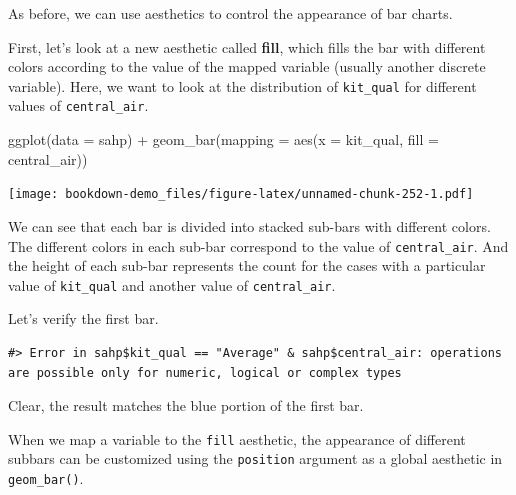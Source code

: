 \documentclass[
]{book}
\newenvironment{Shaded}{\begin{snugshade}}{\end{snugshade}}
\newcommand{\AttributeTok}[1]{\textcolor[rgb]{0.77,0.63,0.00}{#1}}
\newcommand{\FunctionTok}[1]{\textcolor[rgb]{0.00,0.00,0.00}{#1}}
\newcommand{\NormalTok}[1]{#1}
\newcommand{\SpecialCharTok}[1]{\textcolor[rgb]{0.00,0.00,0.00}{#1}}
\newcommand{\StringTok}[1]{\textcolor[rgb]{0.31,0.60,0.02}{#1}}
\begin{document}
As before, we can use aesthetics to control the appearance of bar charts.

First, let's look at a new aesthetic called \textbf{fill}, which fills the bar with different colors according to the value of the mapped variable (usually another discrete variable). Here, we want to look at the distribution of \texttt{kit\_qual} for different values of \texttt{central\_air}.

\begin{Shaded}
\begin{Highlighting}[]
\FunctionTok{ggplot}\NormalTok{(}\AttributeTok{data =}\NormalTok{ sahp) }\SpecialCharTok{+} \FunctionTok{geom\_bar}\NormalTok{(}\AttributeTok{mapping =} \FunctionTok{aes}\NormalTok{(}\AttributeTok{x =}\NormalTok{ kit\_qual, }\AttributeTok{fill =}\NormalTok{ central\_air))}
\end{Highlighting}
\end{Shaded}

\texttt{[image: bookdown-demo\_files/figure-latex/unnamed-chunk-252-1.pdf]}

We can see that each bar is divided into stacked sub-bars with different colors. The different colors in each sub-bar correspond to the value of \texttt{central\_air}. And the height of each sub-bar represents the count for the cases with a particular value of \texttt{kit\_qual} and another value of \texttt{central\_air}.

Let's verify the first bar.

\begin{Shaded}
\end{Shaded}

\begin{verbatim}
#> Error in sahp$kit_qual == "Average" & sahp$central_air: operations are possible only for numeric, logical or complex types
\end{verbatim}

Clear, the result matches the blue portion of the first bar.

When we map a variable to the \texttt{fill} aesthetic, the appearance of different subbars can be customized using the \texttt{position} argument as a global aesthetic in \texttt{geom\_bar()}.
\end{document}
